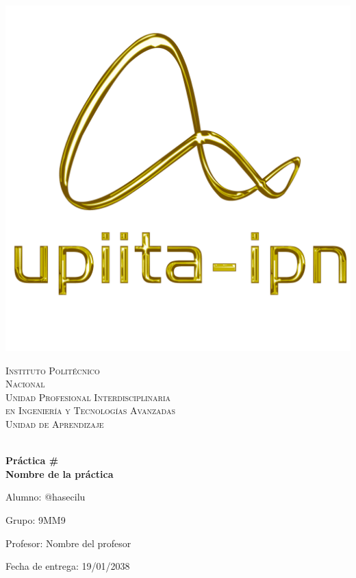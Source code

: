 \begin{center}
\begin{minipage}{0.48\textwidth} 
	\begin{flushright}
		\includegraphics[scale = 0.3]{images/logo_upiita_oro.png}
	\end{flushright}
\end{minipage}


\vspace*{-25mm}  %
\textsc{\Huge Instituto Polit\'ecnico\\ \vspace{15pt} Nacional}\\[20mm]

\textsc{\huge Unidad Profesional Interdisciplinaria\\  \vspace{10pt} en Ingenier\'ia y Tecnolog\'ias Avanzadas}\\[20mm]

\textsc{\LARGE Unidad de Aprendizaje}


\vspace*{10mm}
\HRule \\[4mm]
{ \huge \bfseries Práctica \#\\}\vspace{5mm}
{\LARGE \bfseries Nombre de la práctica}\vspace{2mm}
\HRule \\[15mm]

\begin{flushleft}
	\Large Alumno: @hasecilu
\end{flushleft}
\vspace{5mm}
\begin{flushleft}
	\Large Grupo: 9MM9
\end{flushleft}
\vspace{5mm}
\begin{flushleft}
	\Large Profesor: Nombre del profesor
\end{flushleft}
\vspace{20mm}

{\large Fecha de entrega: 19/01/2038}

\end{center}